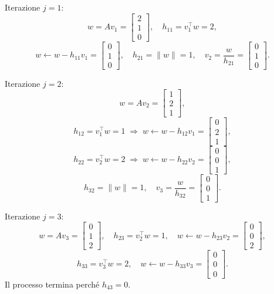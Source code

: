 \documentclass{beamer}
\begin{document}
\begin{frame}{Iterazione $j=1$:}
\[
w = A v_1 =
\begin{bmatrix}2\\1\\0\end{bmatrix},
\quad h_{11}=v_1^\top w=2,
\]
\[
w \leftarrow w - h_{11}v_1 = \begin{bmatrix}0\\1\\0\end{bmatrix},
\quad h_{21}=\|w\|=1,
\quad v_2 = \frac{w}{h_{21}}=\begin{bmatrix}0\\1\\0\end{bmatrix}.
\]

\end{frame}
\begin{frame}{Iterazione $j=2$:}
\[
w = A v_2 =
\begin{bmatrix}1\\2\\1\end{bmatrix},
\]
\[
h_{12}=v_1^\top w=1 \;\Rightarrow\; w \leftarrow w-h_{12}v_1=\begin{bmatrix}0\\2\\1\end{bmatrix},
\]
\[
h_{22}=v_2^\top w=2 \;\Rightarrow\; w \leftarrow w-h_{22}v_2=\begin{bmatrix}0\\0\\1\end{bmatrix},
\]
\[
h_{32}=\|w\|=1,\quad v_3=\frac{w}{h_{32}}=\begin{bmatrix}0\\0\\1\end{bmatrix}.
\]

\end{frame}
\begin{frame}{Iterazione $j=3$:}
\[
w = A v_3 =
\begin{bmatrix}0\\1\\2\end{bmatrix},
\quad h_{23}=v_2^\top w=1,
\quad w \leftarrow w - h_{23}v_2 = \begin{bmatrix}0\\0\\2\end{bmatrix},
\]
\[
h_{33}=v_3^\top w=2,
\quad w \leftarrow w - h_{33}v_3 = \begin{bmatrix}0\\0\\0\end{bmatrix}.
\]
Il processo termina perché $h_{43}=0$.

\end{frame}
\end{document}
